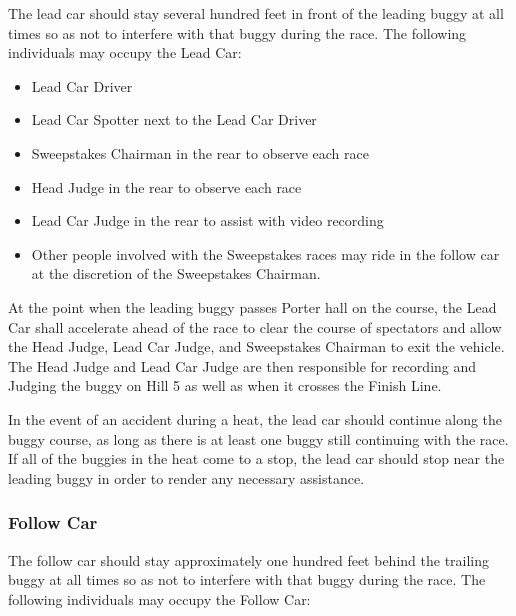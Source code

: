 	The lead car should stay several hundred feet in front of the leading buggy at all times so as not to interfere with that buggy during the race. The following individuals may occupy the Lead Car:

	\begin{itemize}

		\item Lead Car Driver

		\item Lead Car Spotter next to the Lead Car Driver

		\item Sweepstakes Chairman in the rear to observe each race

		\item Head Judge in the rear to observe each race

		\item Lead Car Judge in the rear to assist with video recording

		\item Other people involved with the Sweepstakes races may ride in the follow car at the discretion of the Sweepstakes Chairman.

	\end{itemize}

	At the point when the leading buggy passes Porter hall on the course, the Lead Car shall accelerate ahead of the race to clear the course of spectators and allow the Head Judge, Lead Car Judge, and Sweepstakes Chairman to exit the vehicle. The Head Judge and Lead Car Judge are then responsible for recording and Judging the buggy on Hill 5 as well as when it crosses the Finish Line.

	In the event of an accident during a heat, the lead car should continue along the buggy course, as long as there is at least one buggy still continuing with the race. If all of the buggies in the heat come to a stop, the lead car should stop near the leading buggy in order to render any necessary assistance.


\subsubsection{Follow Car}
\label{subsubsec:Follow Car}

	The follow car should stay approximately one hundred feet behind the trailing buggy at all times so as not to interfere with that buggy during the race. The following individuals may occupy the Follow Car:


